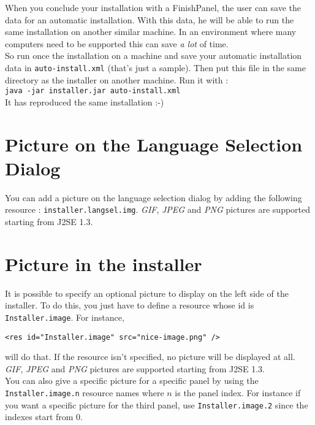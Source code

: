When you conclude your installation with a FinishPanel, the user can
save the data for an automatic installation. With this data, he will be
able to run the same installation on another similar machine. In an
environment where many computers need to be supported this can save
\textsl{a lot} of time.\\

So run once the installation on a machine and save your automatic installation
data in \texttt{auto-install.xml} (that's just a sample). Then put this file in
the same directory as the installer on another machine. Run it with :\\
\texttt{java -jar installer.jar auto-install.xml}\\

It has reproduced the same installation :-)\\

\section{Picture on the Language Selection Dialog}

You can add a picture on the language selection dialog by adding the following
resource : \texttt{installer.langsel.img}. \textsl{GIF}, \textsl{JPEG} and
\textsl{PNG} pictures are supported starting from J2SE 1.3.\\

\section{Picture in the installer}

It is possible to specify an optional picture to display on the left side of the
installer. To do this, you just have to define a resource whose id is
\texttt{Installer.image}. For instance,
\begin{verbatim}
<res id="Installer.image" src="nice-image.png" />
\end{verbatim}
will do that. If the resource isn't specified, no picture will be displayed at
all. \textsl{GIF}, \textsl{JPEG} and
\textsl{PNG} pictures are supported starting from J2SE 1.3.\\

You can also give a specific picture for a specific panel by using the
\texttt{Installer.image.n} resource names where $n$ is the panel index. For
instance if you want a specific picture for the third panel, use
\texttt{Installer.image.2} since the indexes start from 0.\\

